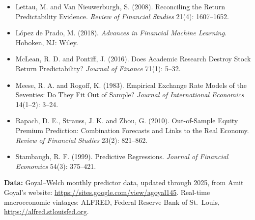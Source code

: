 \begin{itemize}
  \item Lettau, M. and Van Nieuwerburgh, S. (2008). Reconciling the Return Predictability Evidence. \emph{Review of Financial Studies} 21(4): 1607--1652.
  \item L\'opez de Prado, M. (2018). \emph{Advances in Financial Machine Learning}. Hoboken, NJ: Wiley.
  \item McLean, R. D. and Pontiff, J. (2016). Does Academic Research Destroy Stock Return Predictability? \emph{Journal of Finance} 71(1): 5--32.
  \item Meese, R. A. and Rogoff, K. (1983). Empirical Exchange Rate Models of the Seventies: Do They Fit Out of Sample? \emph{Journal of International Economics} 14(1--2): 3--24.
  \item Rapach, D. E., Strauss, J. K. and Zhou, G. (2010). Out-of-Sample Equity Premium Prediction: Combination Forecasts and Links to the Real Economy. \emph{Review of Financial Studies} 23(2): 821--862.
  \item Stambaugh, R. F. (1999). Predictive Regressions. \emph{Journal of Financial Economics} 54(3): 375--421.
\end{itemize}

\textbf{Data:} Goyal--Welch monthly predictor data, updated through 2025, from Amit Goyal's website: \url{https://sites.google.com/view/agoyal145}. Real-time macroeconomic vintages: ALFRED, Federal Reserve Bank of St.\ Louis, \url{https://alfred.stlouisfed.org}.
